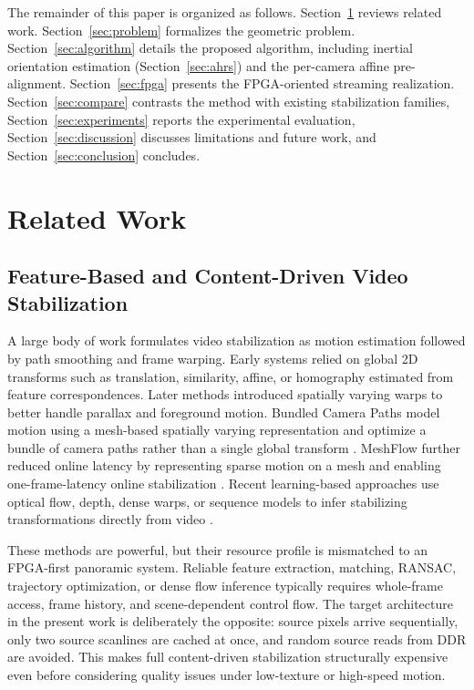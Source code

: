 \documentclass[journal]{IEEEtran}
\begin{document}
The remainder of this paper is organized as follows. Section~\ref{sec:related} reviews related work. Section~\ref{sec:problem} formalizes the geometric problem. Section~\ref{sec:algorithm} details the proposed algorithm, including inertial orientation estimation (Section~\ref{sec:ahrs}) and the per-camera affine pre-alignment. Section~\ref{sec:fpga} presents the FPGA-oriented streaming realization. Section~\ref{sec:compare} contrasts the method with existing stabilization families, Section~\ref{sec:experiments} reports the experimental evaluation, Section~\ref{sec:discussion} discusses limitations and future work, and Section~\ref{sec:conclusion} concludes.

\section{Related Work}
\label{sec:related}
\subsection{Feature-Based and Content-Driven Video Stabilization}
A large body of work formulates video stabilization as motion estimation followed by path smoothing and frame warping. Early systems relied on global 2D transforms such as translation, similarity, affine, or homography estimated from feature correspondences. Later methods introduced spatially varying warps to better handle parallax and foreground motion. Bundled Camera Paths model motion using a mesh-based spatially varying representation and optimize a bundle of camera paths rather than a single global transform \cite{liu2013bundled}. MeshFlow further reduced online latency by representing sparse motion on a mesh and enabling one-frame-latency online stabilization \cite{liu2016meshflow}. Recent learning-based approaches use optical flow, depth, dense warps, or sequence models to infer stabilizing transformations directly from video \cite{lee2021deep3d,yu2021selfie,zhang2023minimum,james2023globalflow}.

These methods are powerful, but their resource profile is mismatched to an FPGA-first panoramic system. Reliable feature extraction, matching, RANSAC, trajectory optimization, or dense flow inference typically requires whole-frame access, frame history, and scene-dependent control flow. The target architecture in the present work is deliberately the opposite: source pixels arrive sequentially, only two source scanlines are cached at once, and random source reads from DDR are avoided. This makes full content-driven stabilization structurally expensive even before considering quality issues under low-texture or high-speed motion.
\end{document}

